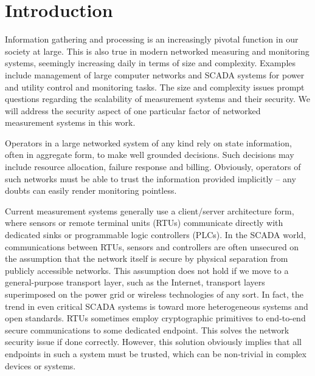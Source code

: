 
\chapter{Introduction}
\label{sec:intro}

Information gathering and processing is an increasingly pivotal function in our society at large. This is also true in modern networked measuring and monitoring systems, seemingly increasing daily in terms of size and complexity. Examples include management of large computer networks and SCADA systems for power and utility control and monitoring tasks. The size and complexity issues prompt questions regarding the scalability of measurement systems and their security. We will address the security aspect of one particular factor of networked measurement systems in this work.

Operators in a large networked system of any kind rely on state information, often in aggregate form, to make well grounded decisions. Such decisions may include resource allocation, failure response and billing. Obviously, operators of such networks must be able to trust the information provided implicitly -- any doubts can easily render monitoring pointless.

Current measurement systems generally use a client/server architecture form, where sensors or remote terminal units (RTUs) communicate directly with dedicated sinks or programmable logic controllers (PLCs). In the SCADA world, communications between RTUs, sensors and controllers are often unsecured on the assumption that the network itself is secure by physical separation from publicly accessible networks. This assumption does not hold if we move to a general-purpose transport layer, such as the Internet, transport layers superimposed on the power grid or wireless technologies of any sort. In fact, the trend in even critical SCADA systems is toward more heterogeneous systems and open standards.
%
RTUs sometimes employ cryptographic primitives to end-to-end secure communications to some dedicated endpoint. This solves the network security issue if done correctly. However, this solution obviously implies that all endpoints in such a system must be trusted, which can be non-trivial in complex devices or systems.

